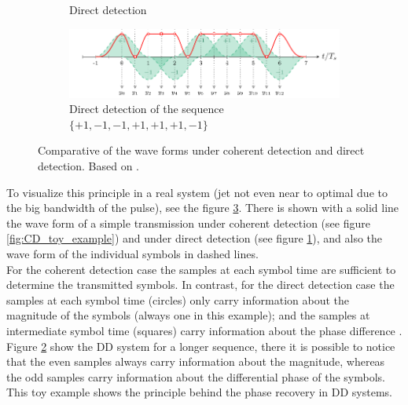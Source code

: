\begin{figure}[htb]
\begin{subfigure}[b]{0.49\textwidth}
         \caption{Direct detection}
         \label{fig:DD_toy_example}
     \end{subfigure}
     \hfill
     \vspace{10mm}
     \begin{subfigure}[b]{0.8\textwidth}
         \centering
         \includegraphics[width=\textwidth]{images/intro/DD_toy_example_long_sq.pdf}
         \caption{Direct detection of the sequence $\{+1,-1,-1,+1,+1,+1,-1\}$}
         \label{fig:DD_toy_example_long_sq}
     \end{subfigure}
        \caption{Comparative of the wave forms under coherent detection and direct detection. Based on \cite{Secondini, Plabst_DD}.}
        \label{fig:DD_vs_CD}
\end{figure}

To visualize this principle in a real system (jet not even near to optimal due to the big bandwidth of the pulse), see the figure \ref{fig:DD_vs_CD}. There is shown with a solid line the wave form of a simple transmission under coherent detection (see figure \ref{fig:CD_toy_example}) and under direct detection (see figure \ref{fig:DD_toy_example}), and also the wave form of the individual symbols in dashed lines.\\

For the coherent detection case the samples at each symbol time are sufficient to determine the transmitted symbols. In contrast, for the direct detection case the samples at each symbol time (circles) only carry information about the magnitude of the symbols (always one in this example); and the samples at intermediate symbol time (squares) carry information about the phase difference \cite{Secondini}.\\

Figure \ref{fig:DD_toy_example_long_sq} show the DD system for a longer sequence, there it is possible to notice that the even samples always carry information about the magnitude, whereas the odd samples carry information about the differential phase of the symbols. This toy example shows the principle behind the phase recovery in DD systems.\\

